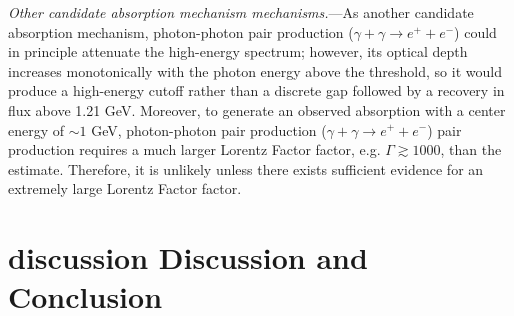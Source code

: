 \documentclass[linenumbers,twocolumn]{aastex631}
\providecommand{\DIFaddtex}[1]{{\protect\color{blue} \sf #1}} %
\providecommand{\DIFdeltex}[1]{{\protect\color{red} \scriptsize #1}} %
\providecommand{\DIFaddbegin}{} %
\providecommand{\DIFaddend}{} %
\providecommand{\DIFdelbegin}{} %
\providecommand{\DIFdelend}{} %
\providecommand{\DIFadd}[1]{\texorpdfstring{\DIFaddtex{#1}}{#1}} %
\providecommand{\DIFdel}[1]{\texorpdfstring{\DIFdeltex{#1}}{}} %
\begin{document}
\textit{Other candidate absorption \DIFdelbegin \DIFdel{mechanism}\DIFdelend \DIFaddbegin \DIFadd{mechanisms}\DIFaddend .}---As another candidate absorption mechanism, \DIFaddbegin \DIFadd{photon-photon pair production ($\gamma+\gamma \to
e^+ + e^-$) could in principle attenuate the high-energy spectrum; however, its optical depth increases monotonically with the photon energy above the threshold, so it would produce a high-energy cutoff rather than a discrete gap followed by a recovery in flux above 1.21 GeV. Moreover, }\DIFaddend to generate an observed absorption with a center energy of $\sim1$ GeV, \DIFdelbegin \DIFdel{photon-photon pair production ($\gamma+\gamma \to 
e^+ + e^-$) }\DIFdelend \DIFaddbegin \DIFadd{pair production }\DIFaddend requires a much larger Lorentz \DIFdelbegin \DIFdel{Factor}\DIFdelend \DIFaddbegin \DIFadd{factor}\DIFaddend , e.g. $\Gamma\gtrsim 1000$, than the estimate. Therefore, it is unlikely unless there exists sufficient evidence for an extremely large Lorentz \DIFdelbegin \DIFdel{Factor}\DIFdelend \DIFaddbegin \DIFadd{factor}\DIFaddend .


\section{\DIFdelbegin \DIFdel{discussion }\DIFdelend \DIFaddbegin \DIFadd{Discussion }\DIFaddend and Conclusion}\label{sec:discussion}
\end{document}
